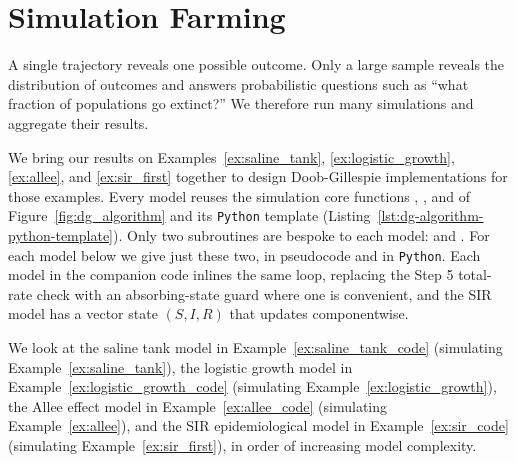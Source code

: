 \section{Simulation Farming}\label{sec:farming}


A single trajectory reveals one possible outcome. Only a large sample reveals the distribution of outcomes and answers probabilistic questions such as ``what fraction of populations go extinct?'' We therefore run many simulations and aggregate their results.

We bring our results on Examples~\ref{ex:saline_tank}, \ref{ex:logistic_growth}, \ref{ex:allee}, and \ref{ex:sir_first} together to design Doob-Gillespie implementations for those examples. Every model reuses the simulation core functions \RatesToPmf{}, \RateToDeltaTime{}, and \PmfToEventIndex{} of Figure~\ref{fig:dg_algorithm} and its \texttt{Python} template (Listing~\ref{lst:dg-algorithm-python-template}). Only two subroutines are bespoke to each model: \MakeRates{} and \MakeDeltaStates{}. For each model below we give just these two, in pseudocode and in \texttt{Python}. Each model in the companion code inlines the same loop, replacing the Step 5 total-rate check with an absorbing-state guard where one is convenient, and the SIR model has a vector state $(S, I, R)$ that \UpdateSirState{} updates componentwise.

We look at the saline tank model in Example~\ref{ex:saline_tank_code} (simulating Example~\ref{ex:saline_tank}), the logistic growth model in Example~\ref{ex:logistic_growth_code} (simulating Example~\ref{ex:logistic_growth}), the Allee effect model in Example~\ref{ex:allee_code} (simulating Example~\ref{ex:allee}), and the SIR epidemiological model in Example~\ref{ex:sir_code} (simulating Example~\ref{ex:sir_first}), in order of increasing model complexity.



